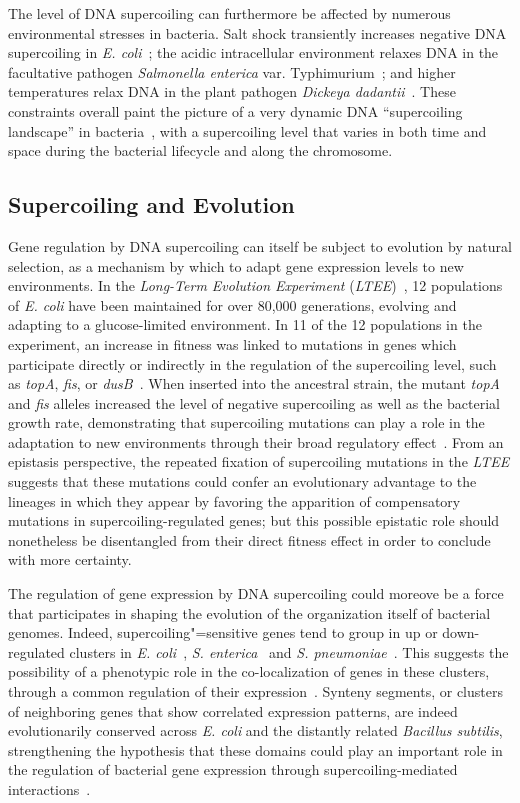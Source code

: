 The level of DNA supercoiling can furthermore be affected by numerous environmental stresses in bacteria.
Salt shock transiently increases negative DNA supercoiling in \emph{E. coli}~\citep{hsieh1991}; the acidic intracellular environment relaxes DNA in the facultative pathogen \emph{Salmonella enterica} var. Typhimurium~\citep{marshall2000}; and higher temperatures relax DNA in the plant pathogen \emph{Dickeya dadantii}~\citep{herault2014}.
These constraints overall paint the picture of a very dynamic DNA ``supercoiling landscape'' in bacteria~\citep{visser2022}, with a supercoiling level that varies in both time and space during the bacterial lifecycle and along the chromosome.

\subsection{Supercoiling and Evolution}

Gene regulation by DNA supercoiling can itself be subject to evolution by natural selection, as a mechanism by which to adapt gene expression levels to new environments.
In the \emph{Long-Term Evolution Experiment} (\emph{LTEE})~\citep{lenski1991}, 12 populations of \emph{E. coli} have been maintained for over 80,000 generations, evolving and adapting to a glucose-limited environment.
In 11 of the 12 populations in the experiment, an increase in fitness was linked to mutations in genes which participate directly or indirectly in the regulation of the supercoiling level, such as \emph{topA}, \emph{fis}, or \emph{dusB}~\citep{crozat2010}.
When inserted into the ancestral strain, the mutant \emph{topA} and \emph{fis} alleles increased the level of negative supercoiling as well as the bacterial growth rate, demonstrating
that supercoiling mutations can play a role in the adaptation to new environments through their broad regulatory effect~\citep{crozat2005}.
From an epistasis perspective, the repeated fixation of supercoiling mutations in the \emph{LTEE} suggests that these mutations could confer an evolutionary advantage to the lineages in which they appear by favoring the apparition of compensatory mutations in supercoiling-regulated genes; but this possible epistatic role should nonetheless be disentangled from their direct fitness effect in order to conclude with more certainty.

The regulation of gene expression by DNA supercoiling could moreove be a force that participates in shaping the evolution of the organization itself of bacterial genomes.
Indeed, supercoiling"=sensitive genes tend to group in up or down-regulated clusters in \emph{E. coli}~\citep{peter2004}, \emph{S. enterica}~\citep{webber2013} and \emph{S. pneumoniae}~\citep{ferrandiz2010}.
This suggests the possibility of a phenotypic role in the co-localization of genes in these clusters, through a common regulation of their expression~\citep{sobetzko2016}.
Synteny segments, or clusters of neighboring genes that show correlated expression patterns, are indeed evolutionarily conserved across \emph{E. coli} and the distantly related \emph{Bacillus subtilis}, strengthening the hypothesis that these domains could play an important role in the regulation of bacterial gene expression through supercoiling-mediated interactions~\citep{junier2016}.


